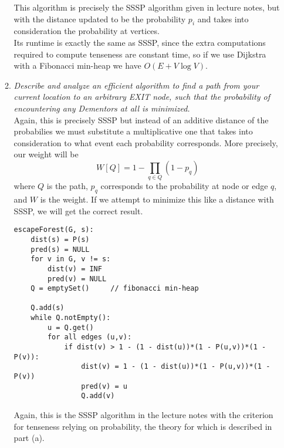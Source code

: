 \documentclass[12pt]{article}
\begin{document}
\begin{enumerate}
\begin{enumerate}
        
        This algorithm is precisely the SSSP algorithm given in lecture notes, but with the distance updated to be the probability $p_i$ and takes into 
consideration the probability at vertices.\\
        
        Its runtime is exactly the same as SSSP, since the extra computations required to compute tenseness are constant time, so if we use Dijkstra with a 
Fibonacci min-heap we have $O(E + V\log V)$.\\
         
        
        \item \textit{Describe and analyze an efficient algorithm to find a path from your current location to an arbitrary EXIT node, such that the 
probability of encountering any Dementors at all is minimized.}\\
        
        Again, this is precisely SSSP but instead of an additive distance of the probabilies we must substitute a multiplicative one that takes into 
consideration to what event each probability corresponds. More precisely, our weight will be
        \[
        W[Q] = 1 - \prod_{q\in Q} (1 - p_q)
        \]
        where $Q$ is the path, $p_q$ corresponds to the probability at node or edge $q$, and $W$ is the weight. If we attempt to minimize this like a distance 
with SSSP, we will get the correct result.
        
        \begin{small}
        \begin{verbatim}
escapeForest(G, s):
    dist(s) = P(s)
    pred(s) = NULL
    for v in G, v != s:
        dist(v) = INF
        pred(v) = NULL
    Q = emptySet()     // fibonacci min-heap
    
    Q.add(s)
    while Q.notEmpty():
        u = Q.get()
        for all edges (u,v):
            if dist(v) > 1 - (1 - dist(u))*(1 - P(u,v))*(1 - P(v)):
                dist(v) = 1 - (1 - dist(u))*(1 - P(u,v))*(1 - P(v))
                pred(v) = u
                Q.add(v)
        \end{verbatim}
        \end{small}
                
        
        
        Again, this is the SSSP algorithm in the lecture notes with the criterion for tenseness relying on probability, the theory for which is described in 
part (a).\\
        

\end{enumerate}
\end{enumerate}
\end{document}
